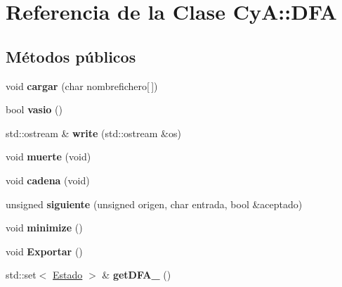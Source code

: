 \hypertarget{class_cy_a_1_1_d_f_a}{}\section{Referencia de la Clase CyA\+:\+:D\+FA}
\label{class_cy_a_1_1_d_f_a}
\subsection*{Métodos públicos}
\begin{DoxyCompactItemize}
\item 
\mbox{\label{class_cy_a_1_1_d_f_a_a753f99c6d3e61fcb7035814e216002d0}} 
void {\bfseries cargar} (char nombrefichero\mbox{[}$\,$\mbox{]})
\item 
\mbox{\label{class_cy_a_1_1_d_f_a_ac5d949a88b7e56236e710848fdadc413}} 
bool {\bfseries vasio} ()
\item 
\mbox{\label{class_cy_a_1_1_d_f_a_a3a16e67349ab36756e3d9c7108b91e56}} 
std\+::ostream \& {\bfseries write} (std\+::ostream \&os)
\item 
\mbox{\label{class_cy_a_1_1_d_f_a_a5b5a105e8559377533cabfdff703d0a5}} 
void {\bfseries muerte} (void)
\item 
\mbox{\label{class_cy_a_1_1_d_f_a_afb17a8e34dc6179abb59bedc97f95dc8}} 
void {\bfseries cadena} (void)
\item 
\mbox{\label{class_cy_a_1_1_d_f_a_ad6a919f15da7b1c173ef8f40153749fc}} 
unsigned {\bfseries siguiente} (unsigned origen, char entrada, bool \&aceptado)
\item 
\mbox{\label{class_cy_a_1_1_d_f_a_a91c3735ac2f148c78457971a63d0a1cb}} 
void {\bfseries minimize} ()
\item 
\mbox{\label{class_cy_a_1_1_d_f_a_aee627abe4a51a332549ae67059591967}} 
void {\bfseries Exportar} ()
\item 
\mbox{\label{class_cy_a_1_1_d_f_a_ae839d9e4d46f389481eb493d6d399668}} 
std\+::set$<$ \mbox{\hyperlink{class_cy_a_1_1_estado}{Estado}} $>$ \& {\bfseries get\+D\+F\+A\+\_\+} ()

\end{DoxyCompactItemize}

